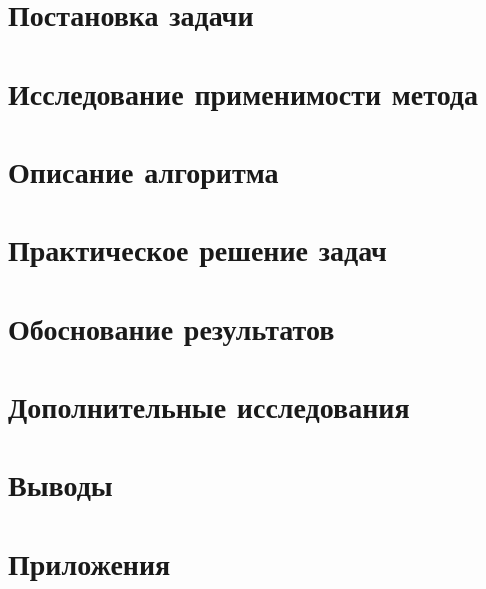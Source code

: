 \documentclass[main.tex]{subfiles}
\begin{document}
\section{Постановка задачи}

\section{Исследование применимости метода}

\section{Описание алгоритма}

\section{Практическое решение задач}

\section{Обоснование результатов}

\section{Дополнительные исследования}

\section{Выводы}

\section{Приложения}

\end{document}
